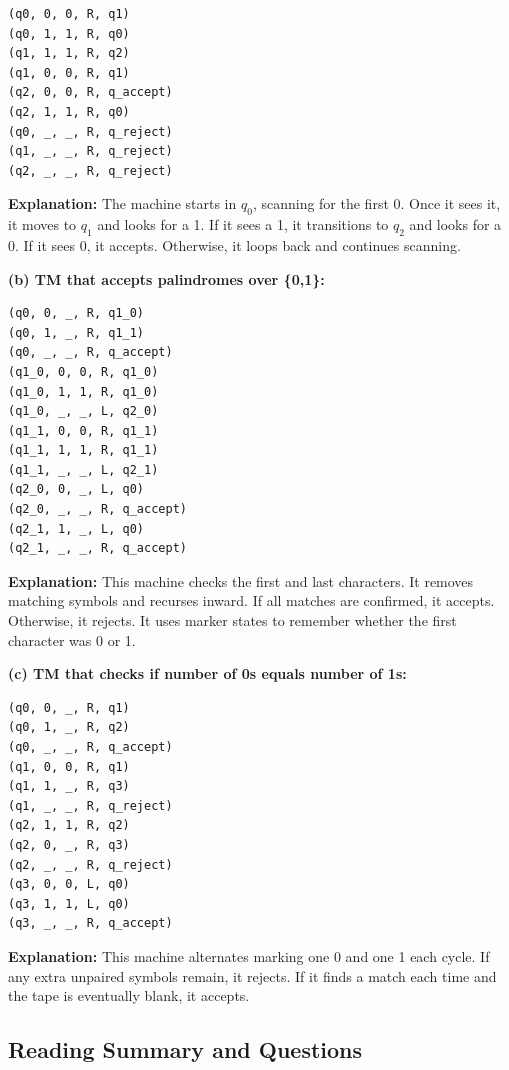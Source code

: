 \documentclass{article}
\theoremstyle{theorem}
\theoremstyle{definition}
\theoremstyle{remark}
\begin{document}
\begin{lstlisting}
(q0, 0, 0, R, q1)
(q0, 1, 1, R, q0)
(q1, 1, 1, R, q2)
(q1, 0, 0, R, q1)
(q2, 0, 0, R, q_accept)
(q2, 1, 1, R, q0)
(q0, _, _, R, q_reject)
(q1, _, _, R, q_reject)
(q2, _, _, R, q_reject)
\end{lstlisting}

\textbf{Explanation:} 
The machine starts in $q_0$, scanning for the first 0. Once it sees it, it moves to $q_1$ and looks for a 1. If it sees a 1, it transitions to $q_2$ and looks for a 0. If it sees 0, it accepts. Otherwise, it loops back and continues scanning.

\bigskip

\textbf{(b) TM that accepts palindromes over \{0,1\}:}

\begin{lstlisting}
(q0, 0, _, R, q1_0)
(q0, 1, _, R, q1_1)
(q0, _, _, R, q_accept)
(q1_0, 0, 0, R, q1_0)
(q1_0, 1, 1, R, q1_0)
(q1_0, _, _, L, q2_0)
(q1_1, 0, 0, R, q1_1)
(q1_1, 1, 1, R, q1_1)
(q1_1, _, _, L, q2_1)
(q2_0, 0, _, L, q0)
(q2_0, _, _, R, q_accept)
(q2_1, 1, _, L, q0)
(q2_1, _, _, R, q_accept)
\end{lstlisting}

\textbf{Explanation:}
This machine checks the first and last characters. It removes matching symbols and recurses inward. If all matches are confirmed, it accepts. Otherwise, it rejects. It uses marker states to remember whether the first character was 0 or 1.

\bigskip

\textbf{(c) TM that checks if number of 0s equals number of 1s:}

\begin{lstlisting}
(q0, 0, _, R, q1)
(q0, 1, _, R, q2)
(q0, _, _, R, q_accept)
(q1, 0, 0, R, q1)
(q1, 1, _, R, q3)
(q1, _, _, R, q_reject)
(q2, 1, 1, R, q2)
(q2, 0, _, R, q3)
(q2, _, _, R, q_reject)
(q3, 0, 0, L, q0)
(q3, 1, 1, L, q0)
(q3, _, _, R, q_accept)
\end{lstlisting}

\textbf{Explanation:}
This machine alternates marking one 0 and one 1 each cycle. If any extra unpaired symbols remain, it rejects. If it finds a match each time and the tape is eventually blank, it accepts.

\subsection*{Reading Summary and Questions}
\end{document}
